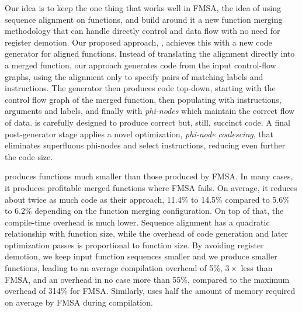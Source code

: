 Our idea is to keep the one thing that works well in FMSA, the idea of using sequence alignment on functions, and build
around it a new function merging methodology that can handle directly control and data flow with no need for register demotion. Our proposed approach,
{\ProjName}, achieves this with a new code generator for aligned functions. Instead of translating the alignment directly into a merged function,
our approach generates code from the input control-flow graphs, using the alignment only to specify pairs of matching labels and instructions.
The generator then produces code top-down, starting with the control flow graph of the merged function, then populating with instructions, arguments and labels, and
finally with \textit{phi-nodes} which maintain the correct flow of data.
{\ProjName} is carefully designed to produce correct but, still, succinct code. A final post-generator stage applies a novel optimization,
\textit{phi-node coalescing}, that eliminates superfluous phi-nodes and select instructions, reducing even further the code size.


{\ProjName} produces functions much smaller than those produced by FMSA. In many cases, it produces profitable merged functions where FMSA
fails. On average, it reduces about twice as much code as their approach, 11.4\% to 14.5\% compared to 5.6\% to 6.2\% depending on the
function merging configuration. On top of that, the compile-time overhead is much lower. Sequence alignment has a quadratic relationship
with function size, while the overhead of code generation and later optimization passes is proportional to function size. By avoiding
register demotion, we keep input function sequences smaller and we produce smaller functions, leading to an average compilation overhead of
5\%, $3\times$ less than FMSA, and an overhead in no case more than 55\%, compared to the maximum overhead of 314\% for FMSA. Similarly,
{\ProjName} uses half the amount of memory required on average by FMSA during compilation.

